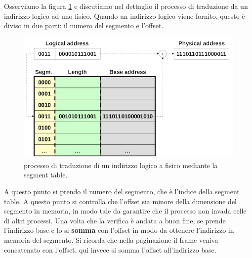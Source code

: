 Osserviamo la figura \ref{fig:segment_table} e discutiamo nel dettaglio il processo di traduzione da un indirizzo logico ad uno fisico. Quando un indirizzo logico viene fornito, questo è diviso in due parti: il numero del segmento e l'offset.
\begin{figure}[h]
    \centering
    \hspace{6.5 em}
    \includegraphics[width = .6\textwidth]{../res/imgs/main memory/segment_table.png}
    \caption{processo di traduzione di un indirizzo logico a fisico mediante la segment table.}
    \label{fig:segment_table}
\end{figure}
A questo punto si prendo il numero del segmento, che è l'indice della segment table. A questo punto si controlla che l'offset sia minore della dimensione del segmento in memoria, in modo tale da garantire che il processo non invada celle di altri processi. Una volta che la verifica è andata a buon fine, se prende l'indirizzo base e lo si \textbf{somma} con l'offset in modo da ottenere l'indirizzo in memoria del segmento. Si ricorda che nella paginazione il frame veniva concatenato con l'offset, qui invece si somma l'offset all'indirizzo base.

% 
